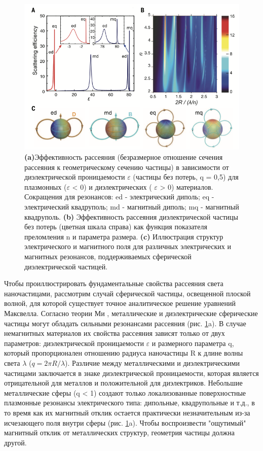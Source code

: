  \begin{figure}[h!]
	\centering
	\includegraphics[width=0.7\linewidth]{images/fig1.png}
	\caption{\textbf{(a)}Эффективность рассеяния (безразмерное отношение сечения рассеяния к геометрическому сечению частицы) в зависимости от диэлектрической проницаемости $\varepsilon$ (частицы без потерь, q = 0,5) для плазмонных ($\varepsilon$  < 0) и диэлектрических ( $\varepsilon$ > 0) материалов. Сокращения для резонансов: ed - электрический диполь; eq - электрический квадруполь; md - магнитный диполь; mq - магнитный квадруполь. \textbf{(b)} Эффективность рассеяния диэлектрической частицы без потерь (цветная шкала справа) как функция показателя преломления n и параметра размера. \textbf{(c)} Иллюстрация структур электрического и магнитного поля для различных электрических и магнитных резонансов, поддерживаемых сферической диэлектрической частицей.}
	\label{fig1}
\end{figure}
\hspace*{2mm}
Чтобы проиллюстрировать фундаментальные свойства рассеяния света наночастицами, рассмотрим случай сферической частицы, освещенной плоской волной, для которой существует точное аналитическое решение уравнений Максвелла. Согласно теории Ми \cite{absorbScattLight}, металлические и диэлектрические сферические частицы могут обладать сильными резонансами рассеяния (рис. \ref{fig1}a). В случае немагнитных материалов их свойства рассеяния зависят только от двух параметров: диэлектрической проницаемости $\varepsilon$  и размерного параметра q, который пропорционален отношению радиуса наночастицы R к длине волны света $\lambda$ ($q = 2\pi R/\lambda$). Различие между металлическими и диэлектрическими частицами заключается в знаке диэлектрической проницаемости, которая является отрицательной для металлов и положительной для диэлектриков. Небольшие металлические сферы (q < 1) создают только локализованные поверхностные плазмонные резонансы электрического типа:  дипольные, квадрупольные и т.д., в то время как их магнитный отклик остается практически незначительным из-за исчезающего поля внутри сферы (рис. \ref{fig1}a).  Чтобы воспроизвести "ощутимый" магнитный отклик от металлических структур, геометрия частицы должна другой. 
